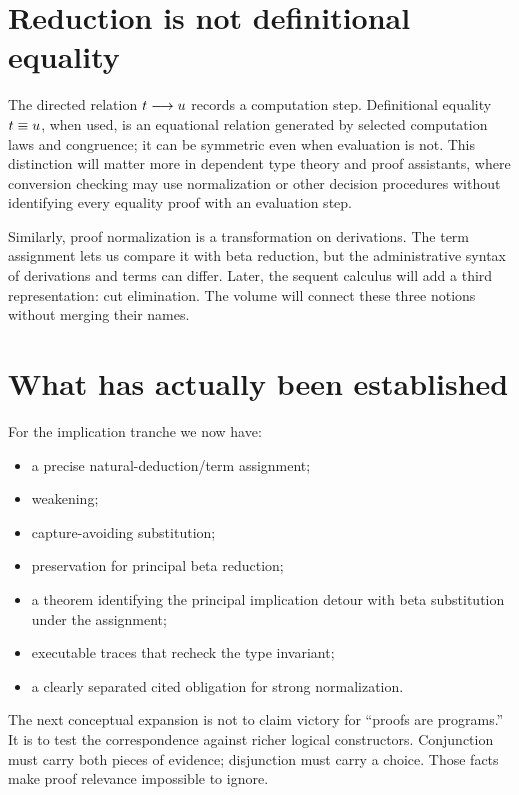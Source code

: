 \section{Reduction is not definitional equality}

The directed relation $t\mathrel{\longrightarrow} u$ records a computation step. Definitional equality $t\mathrel{\equiv} u$, when used, is an equational relation generated by selected computation laws and congruence; it can be symmetric even when evaluation is not. This distinction will matter more in dependent type theory and proof assistants, where conversion checking may use normalization or other decision procedures without identifying every equality proof with an evaluation step.

Similarly, proof normalization is a transformation on derivations. The term assignment lets us compare it with beta reduction, but the administrative syntax of derivations and terms can differ. Later, the sequent calculus will add a third representation: cut elimination. The volume will connect these three notions without merging their names.

\section{What has actually been established}

For the implication tranche we now have:

\begin{itemize}
\item a precise natural-deduction/term assignment;
\item weakening;
\item capture-avoiding substitution;
\item preservation for principal beta reduction;
\item a theorem identifying the principal implication detour with beta substitution under the assignment;
\item executable traces that recheck the type invariant;
\item a clearly separated cited obligation for strong normalization.
\end{itemize}

The next conceptual expansion is not to claim victory for “proofs are programs.” It is to test the correspondence against richer logical constructors. Conjunction must carry both pieces of evidence; disjunction must carry a choice. Those facts make proof relevance impossible to ignore.

